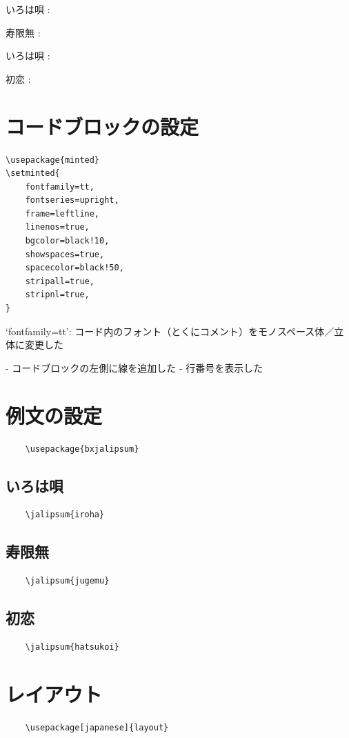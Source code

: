 \documentclass[
    article,
    head_space=25truemm,
    foot_space=10truemm,
    gutter=15truemm]{jlreq}
\begin{document}
\begin{markdown}
いろは唄
: 

寿限無
: 

いろは唄
: 

初恋
: 
\end{markdown}

\section{コードブロックの設定}

\begin{verbatim}
\usepackage{minted}
\setminted{
    fontfamily=tt,
    fontseries=upright,
    frame=leftline,
    linenos=true,
    bgcolor=black!10,
    showspaces=true,
    spacecolor=black!50,
    stripall=true,
    stripnl=true,
}
\end{verbatim}

\begin{markdown}
`fontfamily=tt':
コード内のフォント（とくにコメント）をモノスペース体／立体に変更した

- コードブロックの左側に線を追加した
- 行番号を表示した
\end{markdown}

\section{例文の設定}

\begin{verbatim}
    \usepackage{bxjalipsum}
\end{verbatim}

\subsection{いろは唄}

\begin{verbatim}
    \jalipsum{iroha}
\end{verbatim}

\subsection{寿限無}

\begin{verbatim}
    \jalipsum{jugemu}
\end{verbatim}

\subsection{初恋}

\begin{verbatim}
    \jalipsum{hatsukoi}
\end{verbatim}


\section{レイアウト}

\begin{verbatim}
    \usepackage[japanese]{layout}
\end{verbatim}

\centering
\layout

\printbibliography[title={参考文献}]
\end{document}
